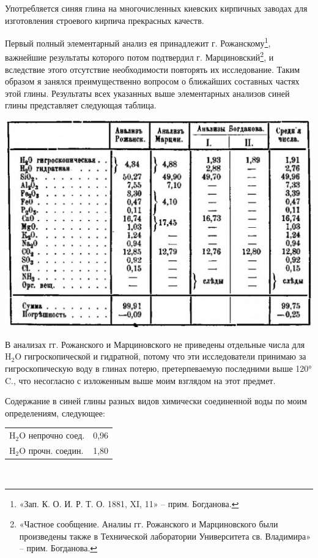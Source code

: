 Употребляется синяя глина на многочисленных киевских кирпичных заводах для изготовления строевого кирпича прекрасных качеств.

Первый полный элементарный анализ ея принадлежит г. Рожанскому\footnote{«Зап. К. О. И. Р. Т. О. 1881, XI, 11» – прим. Богданова.}, важнейшие результаты которого потом подтвердил г. Марциновский\footnote{«Частное сообщение. Аналиы гг. Рожанского и Марциновского были произведены также в Технической лаборатории Университета св. Владимира» – прим. Богданова.}, и вследствие этого отсутствие необходимости повторять их исследование. Таким образом я занялся преимущественно вопросом о ближайших составных частях этой глины. Результаты всех указанных выше элементарных анализов синей глины представляет следующая таблица.


\begin{center}
\includegraphics[width=\linewidth]{pix/table-01.jpg}
\end{center} 

В анализах гг. Рожанского и Марциновского не приведены отдельные числа для H$_2$O гигроскопической и гидратной, потому что эти исследователи принимаю за гигроскопическую воду в глинах потерю, претерпеваемую последними выше 120° C., что несогласно с изложенным выше моим взглядом на этот предмет.

Содержание в синей глины разных видов химически соединенной воды по моим определениям, следующее:\\


\begin{tabular}{| l | l |}
\hline
H$_2$O непрочно соед. & 0,96 \\
H$_2$O прочн. соедин. & 1,80 \\
\hline
\end{tabular}\\

